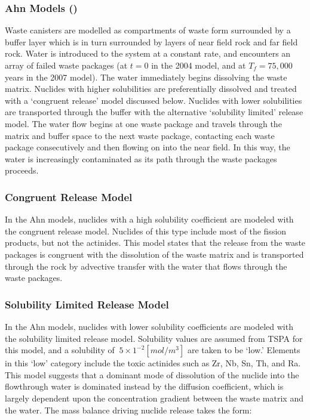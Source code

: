 \subsubsection{Ahn Models (\cite{ahn_environmental_2004,
ahn_environmental_2007})}

Waste canisters are modelled as compartments of waste form surrounded by a
buffer layer which is in turn surrounded by layers of near field rock and far
field rock. Water is introduced to the system at a constant rate, and
encounters an array of failed waste packages (at $t=0$ in the 2004 model, and
at $T_f=75,000$ years in the 2007 model). The water immediately begins
dissolving the waste matrix.  Nuclides with higher solubilities are
preferentially dissolved and treated with a `congruent release' model discussed
below. Nuclides with lower solubilities are transported through the buffer with
the alternative `solubility limited' release model. The water flow begins at
one waste package and travels through the matrix and buffer space to the next
waste package, contacting each waste package consecutively and then flowing on
into the near field. In this way, the water is increasingly contaminated as its
path through the waste packages proceeds.  

\subsubsection{Congruent Release Model} 

In the Ahn models, nuclides with a high solubility coefficient are modeled with
the congruent release model.  Nuclides of this type include most of the fission
products, but not the actinides. This model states that the release from the
waste packages is congruent with the dissolution of the waste matrix and is
transported through the rock by advective transfer with the water that flows
through the waste packages.  

\subsubsection{Solubility Limited Release Model}

In the Ahn models, nuclides with lower solubility coefficients are modeled with
the solubility limited release model.  Solubility values are assumed from TSPA
for this model, and a solubility of $~5\times 1^{-2} [mol/m^3]$ are taken to be
`low.' Elements in this `low' category include the toxic actinides such as Zr,
Nb, Sn, Th, and Ra.  This model suggests that a dominant mode of dissolution of
the nuclide into the flowthrough water is dominated instead by the diffusion
coefficient, which is largely dependent upon the concentration gradient between
the waste matrix and the water. The mass balance driving nuclide release takes
the form:

